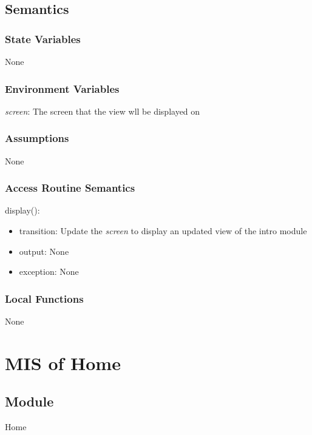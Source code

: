 \documentclass[12pt, titlepage]{article}
\begin{document}
\subsection{Semantics}

\subsubsection{State Variables}

None

\subsubsection{Environment Variables}

\textit{screen}: The screen that the view wll be displayed on

\subsubsection{Assumptions}

None

\subsubsection{Access Routine Semantics}

\noindent display():
\begin{itemize}
\item transition: Update the \textit{screen} to display an updated view of the intro module
\item output: None
\item exception: None
\end{itemize}

\subsubsection{Local Functions}

None

\newpage

\section{MIS of Home} \label{HomeModule}


\subsection{Module}

Home
\end{document}
